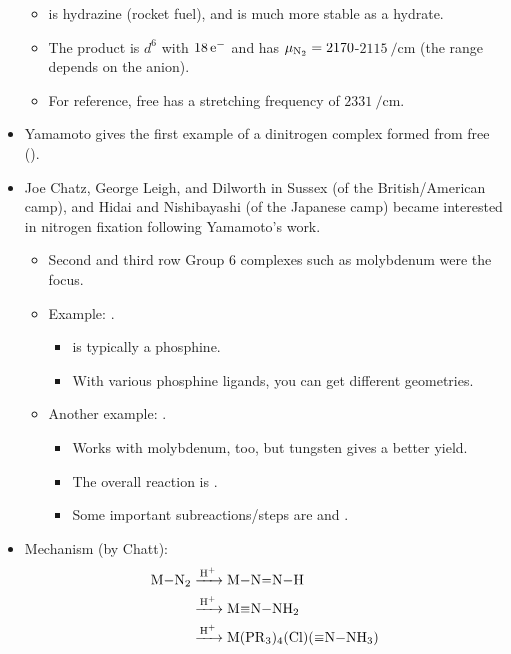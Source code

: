 \documentclass[../notes.tex]{subfiles}
\begin{document}
\begin{itemize}
\begin{itemize}
        \item {} is hydrazine (rocket fuel), and is much more stable as a hydrate.
        \item The product is $d^6$ with $18\,\e[-]$ and has $\mu_{\ce{N2}}=2170$-$\SI{2115}{\per\centi\meter}$ (the range depends on the anion).
        \item For reference, free  has a stretching frequency of $\SI{2331}{\per\centi\meter}$.
    \end{itemize}
    \item Yamamoto gives the first example of a dinitrogen complex formed from free  ().
    \item Joe Chatz, George Leigh, and Dilworth in Sussex (of the British/American camp), and Hidai and Nishibayashi (of the Japanese camp) became interested in nitrogen fixation following Yamamoto's work.
    \begin{itemize}
        \item Second and third row Group 6 complexes such as molybdenum were the focus.
        \item Example: .
        \begin{itemize}
            \item {} is typically a phosphine.
            \item With various phosphine ligands, you can get different geometries.
        \end{itemize}
        \item Another example: .
        \begin{itemize}
            \item Works with molybdenum, too, but tungsten gives a better yield.
            \item The overall reaction is .
            \item Some important subreactions/steps are  and .
        \end{itemize}
    \end{itemize}
    \item Mechanism (by Chatt):
    \begin{align*}
        \ce{M-N2} &\ce{->[H+]} \ce{M-N=N-H}\\
        &\ce{->[H+]} \ce{M#N-NH2}\\
        &\ce{->[H+]} \ce{M(PR3)4(Cl)(#N-NH3)}\\

\end{align*}
\end{itemize}
\end{document}
